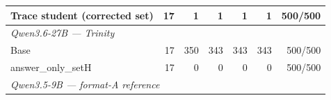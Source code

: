 \begin{table}[t]
{\begin{tabular}{lrrrrrr}
Trace student (corrected set) & 17 & 1 & 1 & 1 & 1 & 500/500 \\
\midrule
\multicolumn{7}{l}{\textit{Qwen3.6-27B --- Trinity}} \\
Base & 17 & 350 & 343 & 343 & 343 & 500/500 \\
answer\_only\_setH & 17 & 0 & 0 & 0 & 0 & 500/500 \\
\midrule
\multicolumn{7}{l}{\textit{Qwen3.5-9B --- format-A reference}} \\

\end{tabular}}
\end{table}
